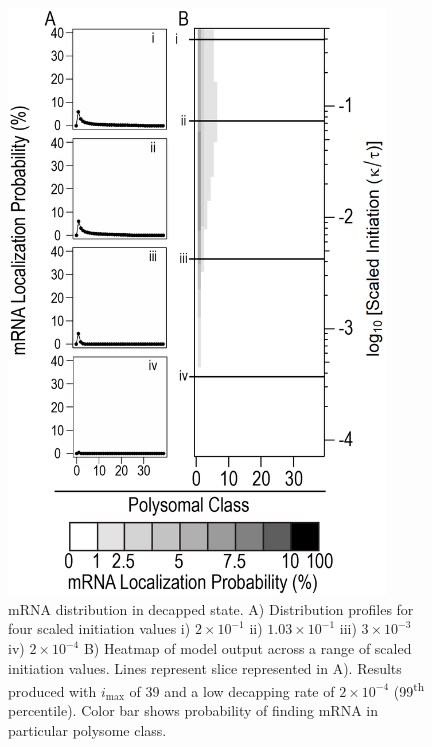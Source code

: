 \documentclass[review]{elsarticle}
\newcommand{\imax}{\ensuremath{{i_{\max}}}\xspace}
\begin{document}
\begin{figure}[!ht]
\centering
\includegraphics[width=100mm]{Images/2023-07-04_Marked_slices.png}
\caption{mRNA distribution in decapped state. A) Distribution profiles for four scaled initiation values i) $2\times 10^{-1}$ ii) $1.03\times 10^{-1}$ iii) $3\times 10^{-3}$ iv) $2\times 10^{-4}$ B) Heatmap of model output across a range of scaled initiation values. Lines represent slice represented in A). Results produced with \imax of 39 and a low decapping rate of $2\times10^{-4}$  (99\textsuperscript{th} percentile). Color bar shows probability of finding mRNA in particular polysome class.}
\end{figure}
\clearpage
\end{document}
